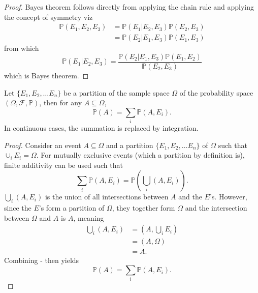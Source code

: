 \begin{proof}
	Bayes theorem follows directly from applying the chain rule and applying the concept of symmetry viz
	\begin{equation}
		\begin{split}
			\mathbb{P}(E_1,E_2,E_3) &= \mathbb{P}(E_1| E_2,E_3)\mathbb{P}(E_2,E_3) \\
			& = \mathbb{P}(E_2|E_1,E_3)\mathbb{P}(E_1,E_3)
		\end{split}
		\label{eq:c2}
	\end{equation}
	from which
	\begin{equation}
		\mathbb{P}(E_1| E_2,E_3) = \frac{\mathbb{P}(E_2| E_1,E_3)\mathbb{P}(E_1,E_2)}{\mathbb{P}(E_2,E_3)}
	\end{equation}
	which is Bayes theorem.
\end{proof}


\begin{theorem}
	\label{theorem:law_of_total_probability}
	Let $\{E_1,E_2,\dots E_n\}$ be a partition of the sample space $\Omega$ of the probability space $(\Omega, \mathcal{F}, \mathbb{P})$, then for any $A\subseteq \Omega$,
	\begin{equation}
		\mathbb{P}(A) = \sum_{i} \mathbb{P}(A,E_i).
		\label{eq:marg}
	\end{equation}
	In continuous cases, the summation is replaced by integration.
\end{theorem}

\begin{proof}
	Consider an event $A\subseteq \Omega$ and a partition $\{E_1,E_2,\dots E_n\}$ of $\Omega$ such that $\cup_{i}E_i=\Omega$. For mutually exclusive events (which a partition by definition is), finite additivity can be used such that
	\begin{equation}
		\sum_{i}\mathbb{P}(A,E_i) = \mathbb{P}(\bigcup_{i}(A,E_i)).
		\label{eq:qq1}
	\end{equation} 
	$\bigcup_{i}(A,E_i)$ is the union of all intersections between $A$ and the $E$'s. However, since the $E$'s form a partition of $\Omega$, they together form $\Omega$ and the intersection between $\Omega$ and $A$ is $A$, meaning
	\begin{equation}
		\begin{split}
			\bigcup_{i}(A,E_i)  &= (A,\bigcup_{i}E_i)\\
			&= (A,\Omega)\\
			& =A.
		\end{split}
	\label{eq:qq2}
	\end{equation}
	Combining - then yields
	\begin{equation}
		\mathbb{P}(A) = \sum_{i} \mathbb{P}(A, E_i).
	\end{equation}
	
\end{proof}

